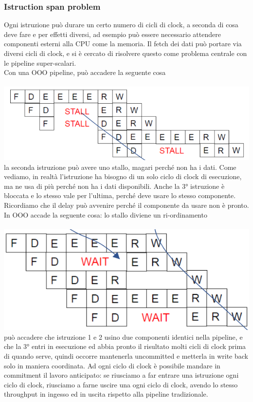 \documentclass[14pt, oneside]{book}
\begin{document}
\subsubsection{Istruction span problem}
Ogni istruzione può durare un certo numero di cicli di clock, a seconda di cosa deve fare e per effetti diversi, ad esempio può essere necessario attendere componenti esterni alla CPU come la memoria. Il fetch dei dati può portare via diversi cicli di clock, e si è cercato di risolvere questo come problema centrale con le pipeline super-scalari.\\ Con una OOO pipeline, può accadere la seguente cosa\\\\
\includegraphics[scale=0.5]{immagini/ooo-pipeline-1}\\
la seconda istruzione può avere uno stallo, magari perché non ha i dati. Come vediamo, in realtà l'istruzione ha bisogno di un solo ciclo di clock di esecuzione, ma ne usa di più perché non ha i dati disponibili. Anche la 3° istruzione è bloccata e lo stesso vale per l'ultima, perché deve usare lo stesso componente. Ricordiamo che il delay può avvenire perché il componente da usare non è pronto.\\ In OOO accade la seguente cosa: lo stallo diviene un ri-ordinamento\\\\
\includegraphics[scale=0.5]{immagini/ooo-pipeline-2}\\
può accadere che istruzione 1 e 2 usino due componenti identici nella pipeline, e che la 3° entri in esecuzione ed abbia pronto il risultato molti cicli di clock prima di quando serve, quindi occorre mantenerla uncommitted e metterla in write back solo in maniera coordinata. Ad ogni ciclo di clock è possibile mandare in commitment il lavoro anticipato: se riusciamo a far entrare una istruzione ogni ciclo di clock, riusciamo a farne uscire una ogni ciclo di clock, avendo lo stesso throughput in ingesso ed in uscita rispetto alla pipeline tradizionale.
\end{document}
